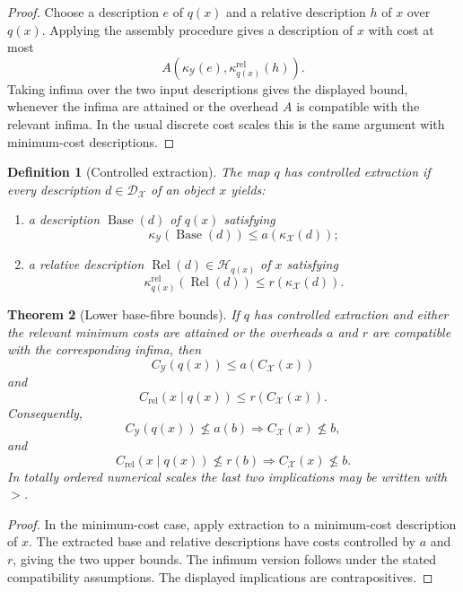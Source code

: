 \documentclass[11pt]{article}
\newtheorem{theorem}{Theorem}[section]
\newtheorem{definition}[theorem]{Definition}
\begin{document}
\begin{proof}
Choose a description \(e\) of \(q(x)\) and a relative description \(h\) of \(x\) over \(q(x)\). Applying the assembly procedure gives a description of \(x\) with cost at most
\[
A(\kappa_\mathcal Y(e),\kappa_{q(x)}^{\mathrm{rel}}(h)).
\]
Taking infima over the two input descriptions gives the displayed bound, whenever the infima are attained or the overhead \(A\) is compatible with the relevant infima. In the usual discrete cost scales this is the same argument with minimum-cost descriptions.
\end{proof}

\begin{definition}[Controlled extraction]
The map \(q\) has controlled extraction if every description \(d\in\mathcal D_\mathcal X\) of an object \(x\) yields:
\begin{enumerate}[label=(\roman*)]
\item a description \(\operatorname{Base}(d)\) of \(q(x)\) satisfying
\[
\kappa_\mathcal Y(\operatorname{Base}(d))\leq a(\kappa_\mathcal X(d));
\]
\item a relative description \(\operatorname{Rel}(d)\in\mathcal H_{q(x)}\) of \(x\) satisfying
\[
\kappa_{q(x)}^{\mathrm{rel}}(\operatorname{Rel}(d))\leq r(\kappa_\mathcal X(d)).
\]
\end{enumerate}
\end{definition}

\begin{theorem}[Lower base-fibre bounds]
If \(q\) has controlled extraction and either the relevant minimum costs are attained or the overheads \(a\) and \(r\) are compatible with the corresponding infima, then
\[
C_\mathcal Y(q(x))\leq a(C_\mathcal X(x))
\]
and
\[
C_{\mathrm{rel}}(x\mid q(x))\leq r(C_\mathcal X(x)).
\]
Consequently,
\[
C_\mathcal Y(q(x))\nleq a(b)\Longrightarrow C_\mathcal X(x)\nleq b,
\]
and
\[
C_{\mathrm{rel}}(x\mid q(x))\nleq r(b)\Longrightarrow C_\mathcal X(x)\nleq b.
\]
In totally ordered numerical scales the last two implications may be written with \(>\).
\end{theorem}

\begin{proof}
In the minimum-cost case, apply extraction to a minimum-cost description of \(x\). The extracted base and relative descriptions have costs controlled by \(a\) and \(r\), giving the two upper bounds. The infimum version follows under the stated compatibility assumptions. The displayed implications are contrapositives.
\end{proof}
\end{document}
